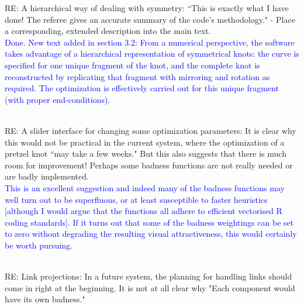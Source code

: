 \documentclass[12pt]{article}
\begin{document}
RE: A hierarchical way of dealing with symmetry: ``This is exactly
what I have done!  The referee gives an accurate summary of the code's
methodology." - Place a corresponding, extended description into the
main text.\textcolor{blue}{\\Done.  New text added in section 3.2:
  From a numerical perspective, the software takes advantage of a
  hierarchical representation of symmetrical knots: the curve is
  specified for one unique fragment of the knot, and the complete knot
  is reconstructed by replicating that fragment with mirroring and
  rotation as required.  The optimization is effectively carried out
  for this unique fragment (with proper end-conditions).\\ \\}




RE: A slider interface for changing some optimization parameters: It
is clear why this would not be practical in the current system, where
the optimization of a pretzel knot ``may take a few weeks."  But this
also suggests that there is much room for improvement!  Perhaps some
badness functions are not really needed or are badly implemented.
\textcolor{blue}{\\ This is an excellent suggestion and indeed many of
  the badness functions may well turn out to be superfluous, or at
  least susceptible to faster heuristics [although I would argue that
    the functions all adhere to efficient vectorised R coding
    standards].  If it turns out that some of the badness weightings
  can be set to zero without degrading the resulting visual
  attractiveness, this would certainly be worth pursuing.\\ \\}

RE: Link projections: In a future system, the planning for handling
links should come in right at the beginning.  It is not at all clear
why "Each component would have its own badness."
\end{document}
